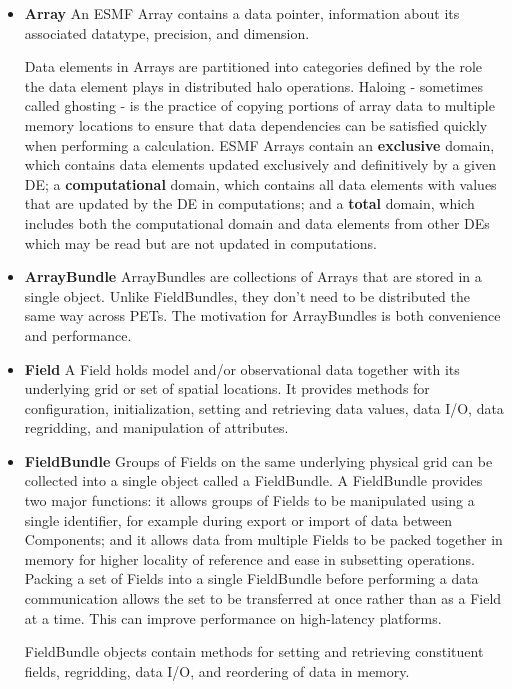 \begin{itemize}

\item {\bf Array}  An ESMF Array contains a data pointer, 
information about its associated datatype, precision, and 
dimension.  

Data elements in Arrays are partitioned into categories 
defined by the role the data element plays in distributed halo 
operations.  Haloing - sometimes called ghosting - is the 
practice of copying portions of array data to multiple memory 
locations to ensure that data dependencies can be satisfied 
quickly when performing a calculation.  ESMF Arrays contain 
an {\bf exclusive} domain, which contains data elements
updated exclusively and definitively by a given DE; a 
{\bf computational} domain, which contains all data elements
with values that are updated by the DE in computations; and 
a {\bf total} domain, which includes both the computational 
domain and data elements from other DEs which may be read 
but are not updated in computations.

\item {\bf ArrayBundle} ArrayBundles are collections of
Arrays that are stored in a single object.  Unlike FieldBundles,
they don't need to be distributed the same way across PETs.  The
motivation for ArrayBundles is both convenience and performance.

\item {\bf Field}  A Field holds model and/or observational 
data together with its underlying grid or set of spatial 
locations.  It provides methods for configuration, 
initialization, setting and retrieving data values, 
data I/O, data regridding, and manipulation of attributes.

\item {\bf FieldBundle} Groups of Fields on the same underlying 
physical grid can be collected into a single object called a FieldBundle.  
A FieldBundle provides two major functions: it allows groups of 
Fields to be manipulated using a single identifier, for example 
during export or import of data between Components; and 
it allows data from multiple Fields to be packed together 
in memory for higher locality of reference and ease in 
subsetting operations.  Packing a set of Fields into a single
FieldBundle before performing a data communication allows the set 
to be transferred at once rather than as a Field at a time.
This can improve performance on high-latency platforms.

FieldBundle objects contain methods for setting and retrieving constituent 
fields, regridding, data I/O, and reordering of data in memory.

\end{itemize}

